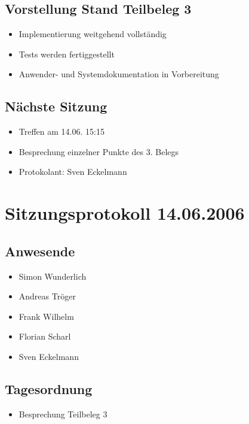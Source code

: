 			\subsection{Vorstellung Stand Teilbeleg 3}
			\begin{itemize}
				\item Implementierung weitgehend vollständig
				\item Tests werden fertiggestellt
				\item Anwender- und Systemdokumentation in Vorbereitung
			\end{itemize}
			\subsection{Nächste Sitzung}
			\begin{itemize}
				\item Treffen am 14.06. 15:15
				\item Besprechung einzelner Punkte des 3. Belegs
			\end{itemize}
		\begin{itemize}
			\item Protokolant: Sven Eckelmann
		\end{itemize}
\newpage
		\section{Sitzungsprotokoll 14.06.2006}
		\subsection{Anwesende}
		\begin{itemize}
			\item Simon Wunderlich
			\item Andreas Tröger
			\item Frank Wilhelm
			\item Florian Scharl
			\item Sven Eckelmann
		\end{itemize}
		\subsection{Tagesordnung}
		\begin{itemize}
			\item Besprechung Teilbeleg 3
		\end{itemize}
